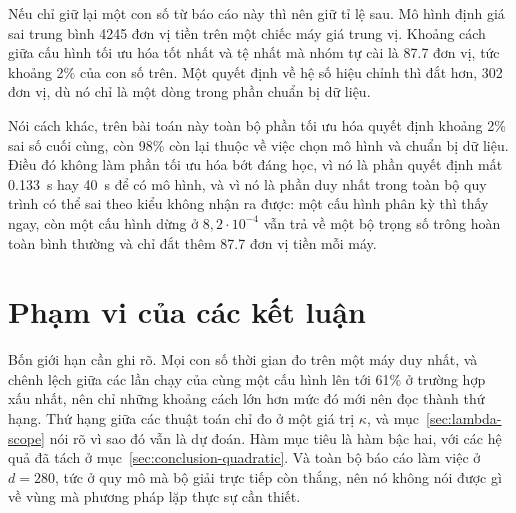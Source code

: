 Nếu chỉ giữ lại một con số từ báo cáo này thì nên giữ tỉ lệ sau. Mô hình định giá
sai trung bình \num{4245} đơn vị tiền trên một chiếc máy giá trung vị. Khoảng
cách giữa cấu hình tối ưu hóa tốt nhất và tệ nhất mà nhóm tự cài là \num{87.7}
đơn vị, tức khoảng 2\% của con số trên. Một quyết định về hệ số hiệu chỉnh thì
đắt hơn, \num{302} đơn vị, dù nó chỉ là một dòng trong phần chuẩn bị dữ liệu.

Nói cách khác, trên bài toán này toàn bộ phần tối ưu hóa quyết định khoảng 2\%
sai số cuối cùng, còn 98\% còn lại thuộc về việc chọn mô hình và chuẩn bị dữ
liệu. Điều đó không làm phần tối ưu hóa bớt đáng học, vì nó là phần quyết định
mất \SI{0.133}{\second} hay \SI{40}{\second} để có mô hình, và vì nó là phần duy
nhất trong toàn bộ quy trình có thể sai theo kiểu không nhận ra được: một cấu
hình phân kỳ thì thấy ngay, còn một cấu hình dừng ở $8{,}2 \cdot 10^{-4}$ vẫn trả
về một bộ trọng số trông hoàn toàn bình thường và chỉ đắt thêm \num{87.7} đơn vị
tiền mỗi máy.

\section{Phạm vi của các kết luận}
\label{sec:conclusion-scope}

Bốn giới hạn cần ghi rõ. Mọi con số thời gian đo trên một máy duy nhất, và
chênh lệch giữa các lần chạy của cùng một cấu hình lên tới 61\% ở trường hợp xấu
nhất, nên chỉ những khoảng cách lớn hơn mức đó mới nên đọc thành thứ hạng. Thứ
hạng giữa các thuật toán chỉ đo ở một giá trị $\kappa$, và
mục~\ref{sec:lambda-scope} nói rõ vì sao đó vẫn là dự đoán. Hàm mục tiêu là hàm
bậc hai, với các hệ quả đã tách ở mục~\ref{sec:conclusion-quadratic}. Và toàn bộ
báo cáo làm việc ở $d = 280$, tức ở quy mô mà bộ giải trực tiếp còn thắng, nên nó
không nói được gì về vùng mà phương pháp lặp thực sự cần thiết.
